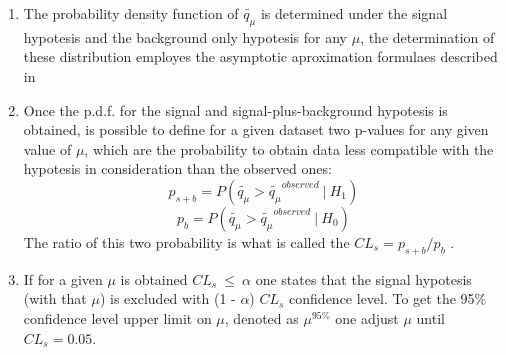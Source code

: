 \begin{enumerate}
%
%
%
	\item The probability density function of $\tilde{q_{\mu}}$ is determined  under the signal hypotesis and the background 
	only hypotesis for any $\mu$, the determination of these distribution employes the asymptotic aproximation formulaes
	described in~\cite{Asympt}
	

	\item Once the p.d.f. for the signal and signal-plus-background hypotesis is obtained, 
	is possible to define for a given dataset  two p-values for any given value of $\mu$, which are the probability 
	to obtain data less compatible with the hypotesis in consideration than the observed ones:
	$$
	p_{s+b} = P(\tilde{q_{\mu}} > \tilde{q_{\mu}}^{observed} ~ | ~ H_1)  
	$$
	$$ 
	p_{b} = P(\tilde{q_{\mu}} > \tilde{q_{\mu}}^{observed} ~ | ~ H_0)
	$$
	The ratio of this two probability is what is called the $CL_{s} = p_{s+b} / p_{b}$ \cite{cls1,cls2}.

	\item If for a given $\mu$ is obtained $CL_{s} ~ \leq ~ \alpha $ one states that the signal hypotesis (with that $\mu$) 
	is excluded with (1 - $\alpha$) $CL_{s}$ confidence level. To get the 95\% confidence level upper limit on $\mu$,
	denoted as $\mu^{95\%}$ one adjust $\mu$ until $CL_{s} = 0.05$. 
\end{enumerate}
